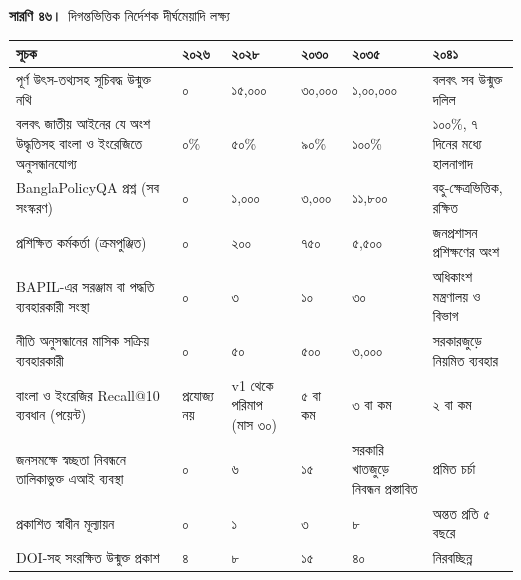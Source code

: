 \documentclass[border=10pt]{standalone}
\begin{document}
\begin{minipage}{22cm}
{\large\bfseries সারণি ৪৬।}\ {\large দিগন্তভিত্তিক নির্দেশক দীর্ঘমেয়াদি লক্ষ্য}\par\vspace{7pt}
\small
{}
\begin{tabularx}{\linewidth}{@{}>{\hsize=2.000\hsize\raggedright\arraybackslash}X>{\hsize=0.667\hsize\raggedright\arraybackslash}X>{\hsize=0.733\hsize\raggedright\arraybackslash}X>{\hsize=0.733\hsize\raggedright\arraybackslash}X>{\hsize=0.800\hsize\raggedright\arraybackslash}X>{\hsize=1.067\hsize\raggedright\arraybackslash}X@{}}
\arrayrulecolor{bapilrule}\toprule
\rowcolor{white}\textbf{সূচক} & \textbf{২০২৬} & \textbf{২০২৮} & \textbf{২০৩০} & \textbf{২০৩৫} & \textbf{২০৪১} \\
\midrule
পূর্ণ উৎস-তথ্যসহ সূচিবদ্ধ উন্মুক্ত নথি & ০ & ১৫,০০০ & ৩০,০০০ & ১,০০,০০০ & বলবৎ সব উন্মুক্ত দলিল \\
বলবৎ জাতীয় আইনের যে অংশ উদ্ধৃতিসহ বাংলা ও ইংরেজিতে অনুসন্ধানযোগ্য & ০\% & ৫০\% & ৯০\% & ১০০\% & ১০০\%, ৭ দিনের মধ্যে হালনাগাদ \\
BanglaPolicyQA প্রশ্ন (সব সংস্করণ) & ০ & ১,০০০ & ৩,০০০ & ১১,৮০০ & বহু-ক্ষেত্রভিত্তিক, রক্ষিত \\
প্রশিক্ষিত কর্মকর্তা (ক্রমপুঞ্জিত) & ০ & ২০০ & ৭৫০ & ৫,৫০০ & জনপ্রশাসন প্রশিক্ষণের অংশ \\
BAPIL-এর সরঞ্জাম বা পদ্ধতি ব্যবহারকারী সংস্থা & ০ & ৩ & ১০ & ৩০ & অধিকাংশ মন্ত্রণালয় ও বিভাগ \\
নীতি অনুসন্ধানের মাসিক সক্রিয় ব্যবহারকারী & ০ & ৫০ & ৫০০ & ৩,০০০ & সরকারজুড়ে নিয়মিত ব্যবহার \\
বাংলা ও ইংরেজির Recall@10 ব্যবধান (পয়েন্ট) & প্রযোজ্য নয় & v1 থেকে পরিমাপ (মাস ৩০) & ৫ বা কম & ৩ বা কম & ২ বা কম \\
জনসমক্ষে স্বচ্ছতা নিবন্ধনে তালিকাভুক্ত এআই ব্যবস্থা & ০ & ৬ & ১৫ & সরকারি খাতজুড়ে নিবন্ধন প্রস্তাবিত & প্রমিত চর্চা \\
প্রকাশিত স্বাধীন মূল্যায়ন & ০ & ১ & ৩ & ৮ & অন্তত প্রতি ৫ বছরে \\
DOI-সহ সংরক্ষিত উন্মুক্ত প্রকাশ & ৪ & ৮ & ১৫ & ৪০ & নিরবচ্ছিন্ন \\
\bottomrule
\end{tabularx}
\par\vspace{5pt}{\footnotesize\itshape পরিকল্পনা-লক্ষ্য, প্রতিশ্রুতি নয়। এগুলো সারণি ৪৭-এর ভিত্তি-দৃশ্যকল্প, ২০২৭-এর প্রথমার্ধে ধাপ ০ এবং জুলাই ২০২৭-এ মাস ১ ধরে নেয় এবং প্রতিটি কৌশলগত পর্যালোচনায় পুনর্নির্ধারিত হয়। মানগুলো প্রতি বছরের শেষের; ২০৩০ থেকে এগুলো সংযুক্তি ব-এর শর্তসাপেক্ষ সম্প্রসারণ (সারণি ৭০) ধরে নেয়। প্রশ্নের সংখ্যায় ৩০০টি আওতাবহির্ভূত প্রশ্ন অন্তর্ভুক্ত।}
\par{}
\end{minipage}
\end{document}
